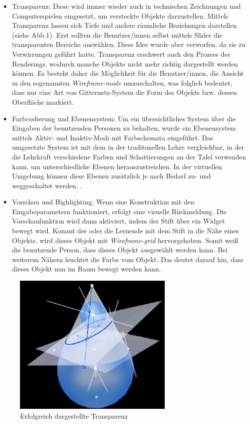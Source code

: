 \documentclass[deutsch]{llncs}
\begin{document}
\begin{itemize}
\item Transparenz: 
Diese wird  immer wieder auch in technischen Zeichnungen und Computerspielen eingesetzt, um versteckte Objekte darzustellen. Mittels Transparenz lassen sich Tiefe und andere räumliche Beziehungen darstellen (siehe Abb.1). Erst sollten die Benutzer/innen selbst mittels Slider die transparenten Bereiche auswählen. Diese Idee wurde aber verworfen, da sie zu Verwirrungen geführt hatte. Transparenz erschwert auch den Prozess des Renderings, wodurch manche Objekte nicht mehr richtig dargestellt werden können\cite{1667626}. 
Es besteht daher die Möglichkeit für die Benutzer/innen, die Ansicht in den sogenannten \emph{Wireframe-mode} umzuschalten, was folglich bedeutet, dass nur eine Art von Gitternetz-System die Form des Objekts bzw. dessen Oberfläche markiert.  
\item Farbcodierung und Ebenensystem:
Um ein übersichtliches System über die Eingaben der benutzenden Personen zu behalten, wurde ein Ebenensystem mittels Aktiv- und Inaktiv-Modi mit Farbschemata eingeführt. Das umgesetzte System ist mit dem in der traditonellen Lehre vergleichbar, in der die Lehrkraft verschiedene Farben und Schattierungen an der Tafel verwenden kann, um unterschiedliche Ebenen herauszustreichen. In der virtuellen Umgebung können diese Ebenen zusätzlich je nach Bedarf zu- und weggeschaltet werden. \cite{1667626}. 
\item Vorschau und Highlighting:
Wenn eine Konstruktion mit den Eingabeparametern funktioniert, erfolgt eine visuelle Rückmeldung. Die Vorschaufunktion wird dann aktiviert, indem der Stift über ein Widget bewegt wird. Kommt der oder die Lernende mit dem Stift in die Nähe eines Objekts, wird dieses Objekt mit \emph{Wireframe-grid} hervorgehoben. Somit weiß die benutzende Person, dass dieses Objekt ausgewählt werden kann. Bei weiterem Nähern leuchtet die Farbe vom Objekt. Das deutet darauf hin, dass dieses Objekt nun im Raum bewegt werden kann\cite{1667626}.  
\end{itemize}
\begin{figure}[h]
	\centering
	\includegraphics[width=0.7\textwidth]{figures/transparency}
	\caption{Erfolgreich dargestellte Transparenz \cite{1667626}}
	\label{fig:transparency}
\end{figure} 
\end{document}
